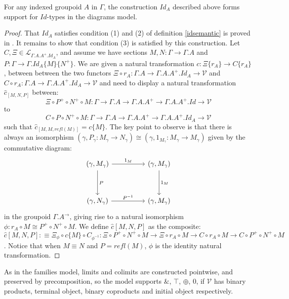 \documentclass[a4paper,english]{lipics-v2018}
\begin{document}
\begin{theorem}For any indexed groupoid $A$ in $\Gamma$, the construction $Id_A$ described above forms support for $Id$-types in the diagrams model.
  \begin{proof}That $Id_A$ satisfies condition (1) and (2) of definition \ref{idsemantic} is proved in \cite{hofmann1998}. It remains to show that condition (3) is satisfied by this construction. Let $C, \Xi \in \mathcal{L}_{\Gamma.A.A^+.Id_A}$, and assume we have sections $M, N : \Gamma \to \Gamma.A$ and $P : \Gamma \to \Gamma.Id_A\{M\}\{N^+\}$. We are given a natural transformation $c : \Xi\{r_A\} \to C\{r_A\}$, between between the two functors $\Xi \circ r_A: \Gamma.A \to \Gamma.A.A^+.Id_A \to \mathcal{V}$ and $C \circ r_A : \Gamma.A \to \Gamma.A.A^+.Id_A \to \mathcal{V}$ and need to display a natural transformation $\hat c_{[M,N,P]}$ between:
    \[
      \Xi \circ P^+ \circ N^+ \circ M: \Gamma \to \Gamma.A \to\Gamma.A.A^+ \to \Gamma.A.A^+.Id \to \mathcal{V}
    \]
    to
    \[
      C \circ P \circ N^+ \circ M : \Gamma \to \Gamma.A \to \Gamma.A.A^+ \to \Gamma.A.A^+.Id_A \to \mathcal{V}
    \]
    such that $\hat c_{[M, M, refl(M)]} = c\{M\}$.
    The key point to observe is that there is always an isomorphism $(\gamma, P_\gamma : M_\gamma \to N_\gamma) \cong (\gamma, 1_{M_\gamma} : M_\gamma \to M_\gamma)$ given by the commutative diagram:
    \[
      \begin{tikzcd}[row sep=huge, column sep=huge]
      (\gamma, M_\gamma) \ar[d, "P"] \ar[r, "1_M"] & (\gamma, M_\gamma) \ar[d, "1_M"]\\
      (\gamma, N_\gamma) \ar[r, "P^{-1}"] & (\gamma, M_\gamma)
      \end{tikzcd}
    \]
    in the groupoid $\Gamma.A^\to$, giving rise to a natural isomorphism $\phi : r_A \circ M \cong P^+ \circ N^+ \circ M$. We define $\hat c[M, N, P]$ as the composite:
\[
\hat c[M,N,P] :\equiv \Xi_\phi \circ c\{M\} \circ C_{\phi^{-1}} : \Xi \circ P^+ \circ N^+ \circ M \to \Xi \circ r_A \circ M \to C \circ r_A \circ M \to C \circ P^+ \circ N^+ \circ M
\]
. Notice that when $M \equiv N$ and $P = refl(M)$, $\phi$ is the identity natural transformation.
\end{proof}
\end{theorem}


As in the families model, limits and colimits are constructed pointwise, and preserved by precomposition, so the model supports $\&$, $\top$, $\oplus$, $0$, if $\mathcal{V}$ has binary products, terminal object, binary coproducts and initial object respectively.
\end{document}
